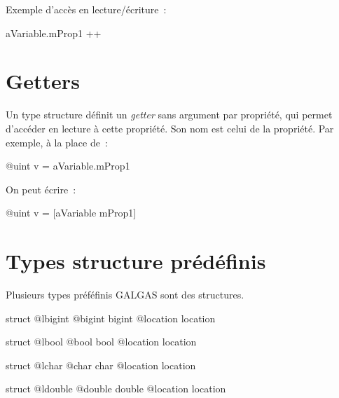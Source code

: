 Exemple d'accès en lecture/écriture~:
\begin{galgas}
aVariable.mProp1 ++
\end{galgas}





\section{Getters}

Un type structure définit un \emph{getter} sans argument par propriété, qui permet d'accéder en lecture à cette propriété. Son nom est celui de la propriété. Par exemple, à la place de~:
\begin{galgas}
@uint v = aVariable.mProp1
\end{galgas}

On peut écrire~:
\begin{galgas}
@uint v = [aVariable mProp1]
\end{galgas}



\section{Types structure prédéfinis}

Plusieurs types préféfinis GALGAS sont des structures.
 

\begin{galgas}
struct @lbigint {
  @bigint bigint
  @location location
}
\end{galgas}


 

\begin{galgas}
struct @lbool {
  @bool bool
  @location location
}
\end{galgas}




\begin{galgas}
struct @lchar {
  @char char
  @location location
}
\end{galgas}



\begin{galgas}
struct @ldouble {
  @double double
  @location location
}
\end{galgas}








